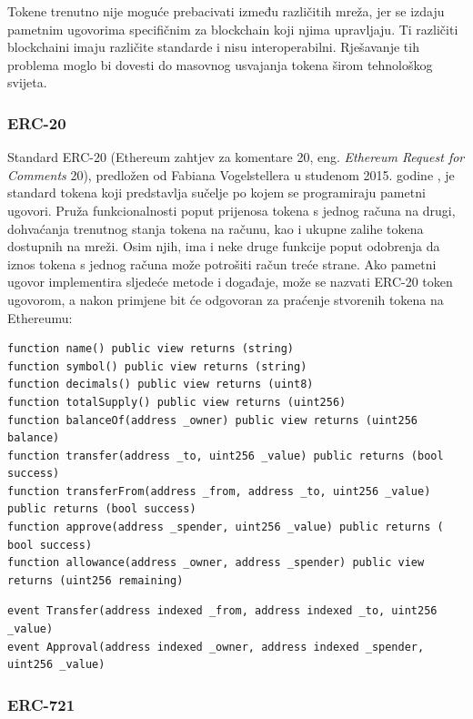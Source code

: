 \documentclass[times, utf8, diplomski]{fer}
\begin{document}
Tokene trenutno nije moguće prebacivati između različitih mreža, jer se izdaju pametnim ugovorima specifičnim za blockchain koji njima upravljaju. Ti različiti blockchaini imaju različite standarde i nisu interoperabilni. Rješavanje tih problema moglo bi dovesti do masovnog usvajanja tokena širom tehnološkog svijeta.
\subsubsection{ERC-20}

Standard ERC-20 (Ethereum zahtjev za komentare 20,  eng.  \textit{Ethereum Request for Comments} 20), predložen od  Fabiana Vogelstellera u studenom 2015. godine \cite{erc20}, je standard tokena koji predstavlja sučelje po kojem se programiraju pametni ugovori. Pruža funkcionalnosti poput prijenosa tokena s jednog računa na drugi, dohvaćanja trenutnog stanja tokena na računu, kao i ukupne zalihe tokena dostupnih na mreži. Osim njih, ima i neke druge funkcije poput odobrenja da iznos tokena s jednog računa može potrošiti račun treće strane. Ako pametni ugovor implementira sljedeće metode i događaje, može se nazvati ERC-20 token ugovorom, a nakon primjene bit će odgovoran za praćenje stvorenih tokena na Ethereumu:

\begin{lstlisting}
function name() public view returns (string)
function symbol() public view returns (string)
function decimals() public view returns (uint8)
function totalSupply() public view returns (uint256)
function balanceOf(address _owner) public view returns (uint256 balance)
function transfer(address _to, uint256 _value) public returns (bool success)
function transferFrom(address _from, address _to, uint256 _value) public returns (bool success)
function approve(address _spender, uint256 _value) public returns ( bool success)
function allowance(address _owner, address _spender) public view returns (uint256 remaining)
\end{lstlisting}
\begin{lstlisting}
event Transfer(address indexed _from, address indexed _to, uint256 _value)
event Approval(address indexed _owner, address indexed _spender,  uint256 _value)
\end{lstlisting}

\subsubsection{ERC-721}
\end{document}
